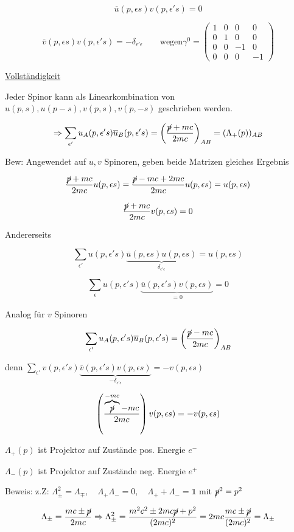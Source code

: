 \[\overline u(p,\epsilon s) v(p,\epsilon' s) = 0\]

\[\overline v(p,\epsilon s) v(p,\epsilon' s) =-\delta_{\epsilon'\epsilon}\qquad \text{wegen} \gamma^0 = \begin{pmatrix}1&0&0&0\\ 0&1&0&0\\0&0&-1&0\\0&0&0&-1\end{pmatrix} \]

\underline{Vollständigkeit}

Jeder Spinor kann als Linearkombination von \(u(p,s), u(p-s), v(p,s), v(p,-s)\) geschrieben werden.

\[\Rightarrow \sum_{\epsilon'} u_{A}(p,\epsilon's )\overline u_B(p,\epsilon' s) = \left(\frac{\cancel p +mc}{2mc}\right)_{AB} = (\Lambda_+(p))_{AB}\]

Bew: Angewendet auf \(u,v\) Spinoren, geben beide Matrizen gleiches Ergebnis

\[\frac{\cancel p + mc}{2mc} u(p,\epsilon s) =\frac{\cancel p -mc+2mc}{2mc} u(p,\epsilon s) = u(p,\epsilon s) \]


\[\frac{\cancel p + mc}{2mc} v(p,\epsilon s) = 0 \]


Andererseits

\[\sum_{\epsilon'} u(p,\epsilon' s)\underbrace{\overline u(p,\epsilon s) u(p,\epsilon s)}_{\delta_{\epsilon'\epsilon}} = u(p,\epsilon s)\]

\[\sum_{\epsilon} u(p,\epsilon' s)\underbrace{\overline u(p,\epsilon' s) v(p,\epsilon s)}_{=0} = 0\]


Analog für \(v\) Spinoren

\[ \sum_{\epsilon'} u_A(p,\epsilon' s) \overline u_B(p,\epsilon' s) = \left(\frac{\cancel p -mc}{2mc}\right)_{AB}\]


denn \(\sum_{\epsilon'} v(p,\epsilon' s)\underbrace{\overline v (p,\epsilon' s) v(p,\epsilon s)}_{-\delta_{\epsilon'\epsilon}} = -v(p,\epsilon s)\)

\[ \left(\frac{\overbrace{\cancel p}^{-mc} -mc}{2mc}\right) v(p,\epsilon s) = -v(p,\epsilon s) \]


\(\Lambda_+(p)\) ist Projektor auf Zustände pos. Energie \(e^-\)

\(\Lambda_-(p)\) ist Projektor auf Zustände neg. Energie \(e^+\)

Beweis: z.Z: \(\Lambda^2_{\pm}=\Lambda_\mp,\quad \Lambda_+\Lambda_- = 0,\quad \Lambda_++\Lambda_- = \mathbb 1\) mit \(\cancel p^2 = p^2\)

\[ \Lambda_{\pm} = \frac{mc\pm \cancel p}{2mc} \Rightarrow \Lambda^2_{\pm} = \frac{m^2c^2\pm 2mc\cancel p+p^2}{(2mc)^2} = 2mc \frac{mc\pm \cancel p}{(2mc)^2} = \Lambda_\pm\]


